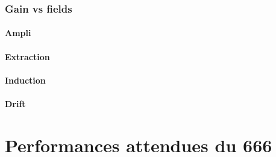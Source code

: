             \subsubsection{Gain vs fields}
                \paragraph{Ampli}
                \paragraph{Extraction}
                \paragraph{Induction}
                \paragraph{Drift}
    
    \section{Performances attendues du 666}